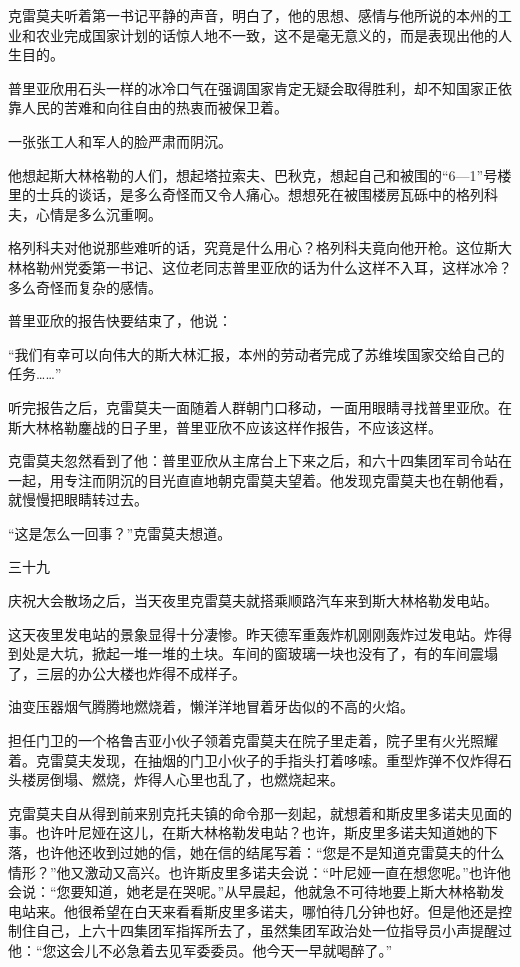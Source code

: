 克雷莫夫听着第一书记平静的声音，明白了，他的思想、感情与他所说的本州的工业和农业完成国家计划的话惊人地不一致，这不是毫无意义的，而是表现出他的人生目的。

普里亚欣用石头一样的冰冷口气在强调国家肯定无疑会取得胜利，却不知国家正依靠人民的苦难和向往自由的热衷而被保卫着。

一张张工人和军人的脸严肃而阴沉。

他想起斯大林格勒的人们，想起塔拉索夫、巴秋克，想起自己和被围的“6—1”号楼里的士兵的谈话，是多么奇怪而又令人痛心。想想死在被围楼房瓦砾中的格列科夫，心情是多么沉重啊。

格列科夫对他说那些难听的话，究竟是什么用心？格列科夫竟向他开枪。这位斯大林格勒州党委第一书记、这位老同志普里亚欣的话为什么这样不入耳，这样冰冷？多么奇怪而复杂的感情。

普里亚欣的报告快要结束了，他说：

“我们有幸可以向伟大的斯大林汇报，本州的劳动者完成了苏维埃国家交给自己的任务……”

听完报告之后，克雷莫夫一面随着人群朝门口移动，一面用眼睛寻找普里亚欣。在斯大林格勒鏖战的日子里，普里亚欣不应该这样作报告，不应该这样。

克雷莫夫忽然看到了他：普里亚欣从主席台上下来之后，和六十四集团军司令站在一起，用专注而阴沉的目光直直地朝克雷莫夫望着。他发现克雷莫夫也在朝他看，就慢慢把眼睛转过去。

“这是怎么一回事？”克雷莫夫想道。

三十九

庆祝大会散场之后，当天夜里克雷莫夫就搭乘顺路汽车来到斯大林格勒发电站。

这天夜里发电站的景象显得十分凄惨。昨天德军重轰炸机刚刚轰炸过发电站。炸得到处是大坑，掀起一堆一堆的土块。车间的窗玻璃一块也没有了，有的车间震塌了，三层的办公大楼也炸得不成样子。

油变压器烟气腾腾地燃烧着，懒洋洋地冒着牙齿似的不高的火焰。

担任门卫的一个格鲁吉亚小伙子领着克雷莫夫在院子里走着，院子里有火光照耀着。克雷莫夫发现，在抽烟的门卫小伙子的手指头打着哆嗦。重型炸弹不仅炸得石头楼房倒塌、燃烧，炸得人心里也乱了，也燃烧起来。

克雷莫夫自从得到前来别克托夫镇的命令那一刻起，就想着和斯皮里多诺夫见面的事。也许叶尼娅在这儿，在斯大林格勒发电站？也许，斯皮里多诺夫知道她的下落，也许他还收到过她的信，她在信的结尾写着：“您是不是知道克雷莫夫的什么情形？”他又激动又高兴。也许斯皮里多诺夫会说：“叶尼娅一直在想您呢。”也许他会说：“您要知道，她老是在哭呢。”从早晨起，他就急不可待地要上斯大林格勒发电站来。他很希望在白天来看看斯皮里多诺夫，哪怕待几分钟也好。但是他还是控制住自己，上六十四集团军指挥所去了，虽然集团军政治处一位指导员小声提醒过他：“您这会儿不必急着去见军委委员。他今天一早就喝醉了。”


